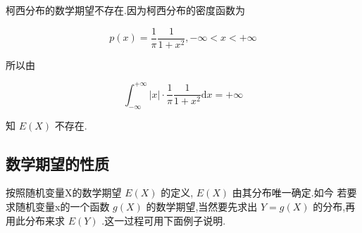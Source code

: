 \begin{example}
	柯西分布的数学期望不存在.因为柯西分布的密度函数为
	
	\[ 
	p(x)=\frac{1}{\pi} \frac{1}{1+x^{2}},-\infty<x<+\infty
	\]
	
	所以由
	
	\[ 
	\int_{-\infty}^{+\infty}|x| \cdot \frac{1}{\pi} \frac{1}{1+x^{2}} \mathrm{d} x=+\infty
	\]
	
	知 $ E(X) $ 不存在.
	
\end{example}

\subsection{数学期望的性质}

按照随机变量X的数学期望 $ E(X) $ 的定义, $ E(X) $ 由其分布唯一确定.如今
若要求随机变量x的一个函数 $ g(X) $ 的数学期望,当然要先求出 $ Y=g(X) $ 的分布,再用此分布来求 $ E(Y ) $ .这一过程可用下面例子说明.

